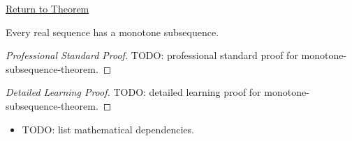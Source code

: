 \newpage
{}
\label{prf:monotone-subsequence-theorem}

\begin{remark*}[Return]
\hyperref[thm:monotone-subsequence-theorem]{Return to Theorem}
\end{remark*}

\begin{theorem*}
Every real sequence has a monotone subsequence.

\smallskip
\noindent
\end{theorem*}

\begin{proof}[Professional Standard Proof]
\LRAProofBodyStart
TODO: professional standard proof for monotone-subsequence-theorem.
\end{proof}

\begin{proof}[Detailed Learning Proof]
\LRAProofBodyStart
TODO: detailed learning proof for monotone-subsequence-theorem.
\end{proof}

\begin{remark*}
\end{remark*}

\begin{dependencies}
\begin{itemize}
  \item TODO: list mathematical dependencies.
\end{itemize}
\end{dependencies}

\clearpage

